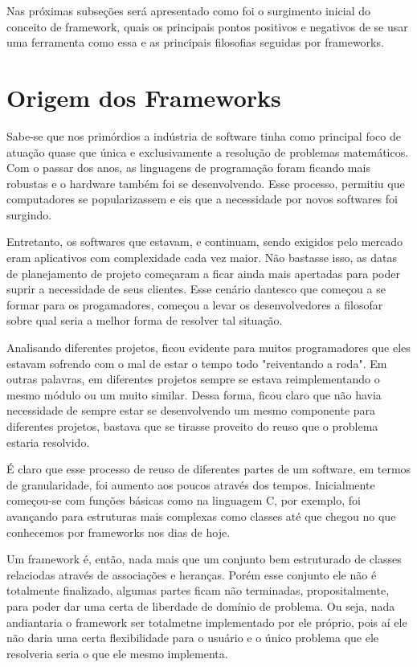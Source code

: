 \documentclass[
    12pt,       %
    openright,      %
    twoside,      %
    a4paper,      %
    english,      %
    french,       %
    spanish,      %
    brazil,       %
    ]{abntex2}
\begin{document}
      Nas próximas subseções será apresentado como foi o surgimento inicial
      do conceito de framework, quais os principais pontos positivos e
      negativos de se usar uma ferramenta como essa e as principais filosofias
      seguidas por frameworks.

      \section{Origem dos Frameworks}
          Sabe-se que nos primórdios a indústria de software tinha como principal
          foco de atuação quase que única e exclusivamente a resolução de problemas
          matemáticos. Com o passar dos anos, as linguagens de programação
          foram ficando mais robustas e o hardware também foi se desenvolvendo. Esse
          processo, permitiu que computadores se popularizassem e eis que a necessidade
          por novos softwares foi surgindo.

          Entretanto, os softwares que estavam, e continuam, sendo exigidos pelo
          mercado eram aplicativos com complexidade cada vez maior. Não bastasse isso,
          as datas de planejamento de projeto começaram a ficar ainda mais apertadas
          para poder suprir a necessidade de seus clientes. Esse cenário dantesco
          que começou a se formar para os progamadores, começou a levar os desenvolvedores
          a filosofar sobre qual seria a melhor forma de resolver tal situação.

          Analisando diferentes projetos, ficou evidente para muitos programadores
          que eles estavam sofrendo com o mal de estar o tempo todo "reiventando
          a roda". Em outras palavras, em diferentes projetos sempre se estava
          reimplementando o mesmo módulo ou um muito similar. Dessa forma, ficou
          claro que não havia necessidade de sempre estar se desenvolvendo um mesmo
          componente para diferentes projetos, bastava que se tirasse proveito do reuso
          que o problema estaria resolvido.

          É claro que esse processo de reuso de diferentes partes de um software,
          em termos de granularidade, foi aumento aos poucos através dos tempos.
          Inicialmente começou-se com funções básicas como na linguagem C, por exemplo,
          foi avançando para estruturas mais complexas como classes até que chegou
          no que conhecemos por frameworks nos dias de hoje.

          Um framework é, então, nada mais que um conjunto bem estruturado de classes
          relaciodas através de associações e heranças. Porém esse conjunto ele não
          é totalmente finalizado, algumas partes ficam não terminadas, propositalmente,
          para poder dar uma certa de liberdade de domínio de problema. Ou seja, nada
          andiantaria o framework ser totalmetne implementado por ele próprio, pois
          aí ele não daria uma certa flexibilidade para o usuário e o único problema
          que ele resolveria seria o que ele mesmo implementa.
\end{document}
